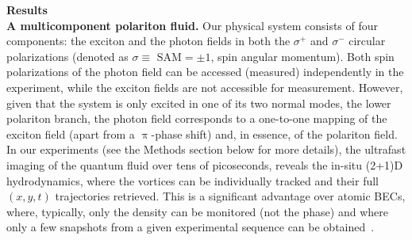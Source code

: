 \documentclass[aps,prb,twocolumn,superscriptaddress,nofootinbib]{revtex4}
\def\editr#1{#1}
\begin{document}
\noindent \textbf{Results}\\
\noindent \textbf{A multicomponent polariton fluid.}
Our physical system consists of four components: the exciton and the
photon fields in both the $\sigma^+$ and $\sigma^-$ \editr{circular} polarizations
\editr{(denoted as $\sigma \equiv \text{ SAM}=\pm1$, spin angular momentum)}.
Both spin polarizations of the photon field can be accessed (measured)
independently in the experiment, while the exciton fields are not
accessible for measurement. However, given that the system is only excited
in one of its two normal modes, the lower polariton branch, the photon
field corresponds to a one-to-one mapping of the exciton field
(apart from a $\uppi$-phase shift) and, in essence, of the polariton field.
In our experiments
(see the Methods section below for more details),
the ultrafast imaging of the quantum fluid over tens of picoseconds,
reveals the in-situ (2+1)D hydrodynamics, where the vortices
can be individually tracked and their full $(x,y,t)$ trajectories retrieved.
%
This is a significant advantage over atomic BECs, where, typically, only
the density can be monitored (not the phase)
and where only a few snapshots from a given experimental sequence can be obtained~\cite{Freilich1182}.\\
%
\end{document}
